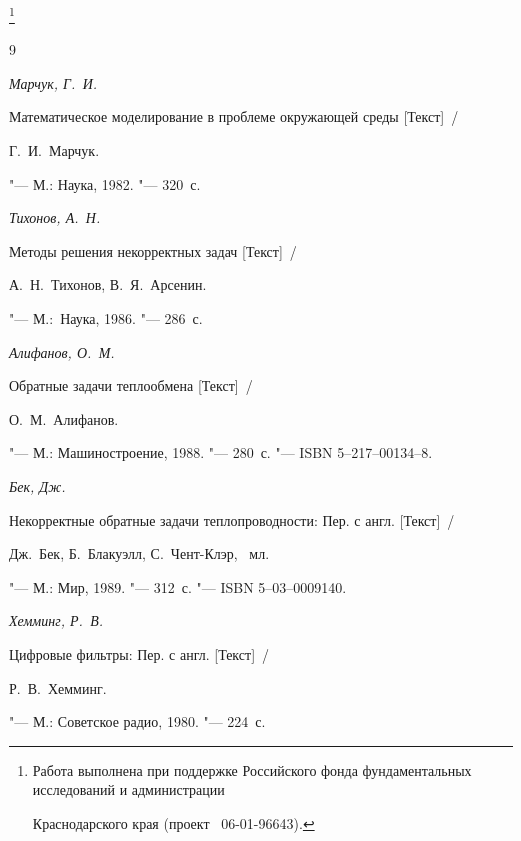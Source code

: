 \thanks{Работа выполнена при поддержке Российского фонда фундаментальных исследований и администрации


Краснодарского края {\rm (}проект \No~06-01-96643{\rm)}.}
















\begin{thebibliography}{9}







 \emph{Марчук,  Г.\, И.}


 Математическое моделирование в проблеме окружающей среды [Текст]~/


 Г.\, И.~Марчук.


 "--- М.: Наука,  1982. "--- 320~с.







 \emph{Тихонов,  А.\, Н.}


 Методы решения некорректных задач [Текст]~/


 А.\, Н.~Тихонов,  В.\, Я.~Арсенин.


 "--- М.:~Наука,  1986. "--- 286~с.







 \emph{Алифанов,  О.\, М.}


 Обратные задачи теплообмена [Текст]~/


 О.\, М.~Алифанов.


 "--- М.: Машиностроение,  1988. "--- 280~с. "--- ISBN 5--217--00134--8.







 \emph{Бек,  Дж.}


 Некорректные обратные задачи теплопроводности: Пер. с англ. [Текст]~/


 Дж.~Бек,  Б.~Блакуэлл,  С.~Чент-Клэр, ~мл.


 "--- М.: Мир,  1989. "--- 312~с. "--- ISBN 5--03--0009140. %







 \emph{Хемминг,  Р.\, В.}


 Цифровые фильтры: Пер. с англ. [Текст]~/


 Р.\, В.~Хемминг.


 "--- М.: Советское радио,  1980. "--- 224~с.





\end{thebibliography}








